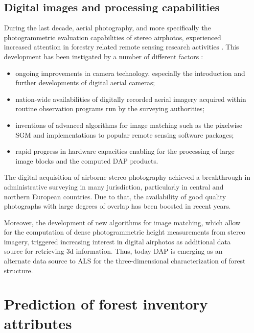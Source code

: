 \subsection{Digital images and processing capabilities}

During the last decade, aerial photography, and more specifically the photogrammetric evaluation capabilities of stereo airphotos,
experienced increased attention in forestry related remote sensing research activities \parencite{White.2013b,Holopainen.2015,White.2016}. 
This development has been instigated by a number of different factors \parencite{Leberl.2010,Haala.2012}:

\begin{itemize}
	\item ongoing improvements in camera technology, especially the introduction and further developments of digital aerial cameras;
	\item nation-wide availabilities of digitally recorded aerial imagery acquired within routine observation programs 
		run by the surveying authorities;
	\item inventions of advanced algorithms for image matching such as the pixelwise \ac{SGM} 
		and implementations to popular remote sensing software packages;
	\item rapid progress in hardware capacities enabling for the processing of large image blocks and the computed \ac{DAP} products.
	
\end{itemize}

\noindent The digital acquisition of airborne stereo photography achieved a breakthrough in administrative surveying in many jurisdiction, 
particularly in central and northern European countries.  Due to that, the availability of good quality photographs
with large degrees of overlap has been boosted in recent years.

Moreover, the development of new algorithms for image matching, which allow for the computation of dense photogrammetric height measurements
from stereo imagery, triggered increasing interest in digital airphotos as additional data source for retrieving 3d information.  
Thus, today \ac{DAP} is emerging as an alternate data source to \ac{ALS} for the three-dimensional characterization of forest structure.



\section{Prediction of forest inventory attributes}\label{sec:ABA}

